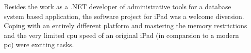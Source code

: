 

Besides the work as a .NET developer of administrative tools for a database system based application, 
the software project \Nyaya for iPad was a welcome diversion.
Coping with an entirely different platform and mastering 
the memory restrictions and the very limited cpu speed of an original iPad 
(in comparsion to a modern pc) were exciting tasks. 



